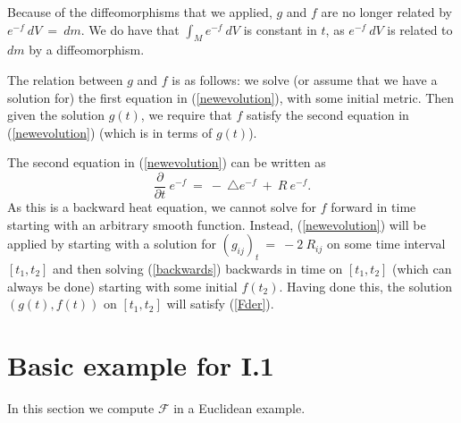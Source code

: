 Because of the diffeomorphisms that we applied,
$g$ and $f$ are no longer related by
$e^{-f} \: dV \: = \: dm$. We do have that
$\int_M e^{-f} \: dV$ is constant in $t$, as
$e^{-f} \: dV$ is related to $dm$ by a diffeomorphism.

The relation between $g$ and $f$ is as follows:
we solve (or assume that we have a solution for)
the first equation in (\ref{newevolution}), with some initial
metric.
Then given the solution $g(t)$, we require that $f$ satisfy
the second equation in (\ref{newevolution}) (which is in
terms of $g(t)$).

The second equation in
(\ref{newevolution}) can be written as
\begin{equation} \label{backwards}
\frac{\partial}{\partial t} \: e^{-f} \: = \: - \: \triangle e^{-f}
\: + \: R \: e^{-f}.
\end{equation}
As this is a backward heat equation, we cannot solve for $f$
forward in time starting with an arbitrary smooth function.
Instead, (\ref{newevolution}) will be applied by
starting with a solution for $(g_{ij})_t \: = \: -2 \: R_{ij}$ on
some time interval $[t_1, t_2]$ and then solving
(\ref{backwards}) backwards in time on $[t_1, t_2]$
(which can always be done) starting with some initial
$f(t_2)$. Having done this, the solution $(g(t), f(t))$ on $[t_1, t_2]$
will satisfy (\ref{Fder}).

\section{Basic example for I.1}

In this section we compute ${\mathcal F}$ in a Euclidean example.

